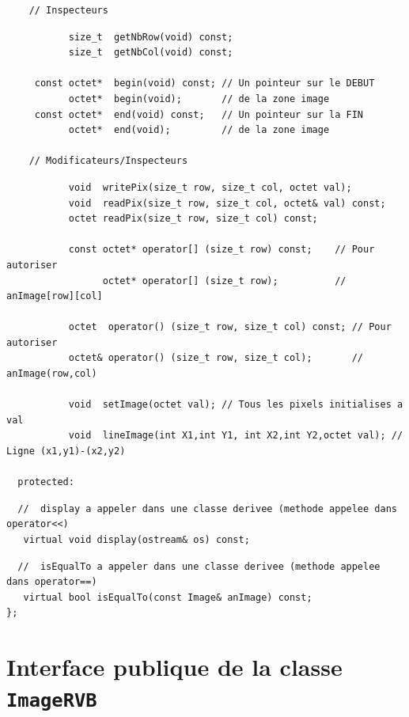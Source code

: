 \documentclass[12pt]{article}
\begin{document}
\begin{footnotesize}
\begin{verbatim}
    // Inspecteurs
\end{verbatim}
\vspace{-0.3cm}
\begin{verbatim}
           size_t  getNbRow(void) const;
           size_t  getNbCol(void) const;

     const octet*  begin(void) const; // Un pointeur sur le DEBUT
           octet*  begin(void);       // de la zone image
     const octet*  end(void) const;   // Un pointeur sur la FIN
           octet*  end(void);         // de la zone image

    // Modificateurs/Inspecteurs
\end{verbatim}
\vspace{-0.3cm}
\begin{verbatim}
           void  writePix(size_t row, size_t col, octet val);
           void  readPix(size_t row, size_t col, octet& val) const;
           octet readPix(size_t row, size_t col) const;

           const octet* operator[] (size_t row) const;    // Pour autoriser
                 octet* operator[] (size_t row);          // anImage[row][col]

           octet  operator() (size_t row, size_t col) const; // Pour autoriser
           octet& operator() (size_t row, size_t col);       // anImage(row,col)

           void  setImage(octet val); // Tous les pixels initialises a val
           void  lineImage(int X1,int Y1, int X2,int Y2,octet val); // Ligne (x1,y1)-(x2,y2)

  protected:
\end{verbatim}
\vspace{-0.3cm}
\begin{verbatim}
  //  display a appeler dans une classe derivee (methode appelee dans operator<<)
   virtual void display(ostream& os) const;
\end{verbatim}
\begin{verbatim}
  //  isEqualTo a appeler dans une classe derivee (methode appelee dans operator==)
   virtual bool isEqualTo(const Image& anImage) const;
};
\end{verbatim}
\end{footnotesize}

\section{Interface publique de la classe {\tt ImageRVB}}
\end{document}
